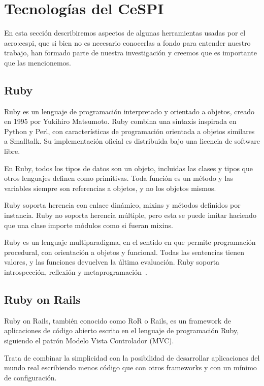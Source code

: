 \section{Tecnologías del CeSPI}
\label{anexo:A}

En esta sección describiremos aspectos de algunas herramientas usadas por el
\gls{acro:cespi}, que si bien no es necesario conocerlas a fondo para entender
nuestro trabajo, han formado parte de nuestra investigación y creemos que es
importante que las mencionemos.

\subsection{Ruby}

Ruby es un lenguaje de programación interpretado y orientado a objetos, creado
en 1995 por Yukihiro Matsumoto. Ruby combina una sintaxis inspirada en Python y
Perl, con características de programación orientada a objetos similares a
Smalltalk. Su implementación oficial es distribuida bajo una licencia de
software libre.

En Ruby, todos los tipos de datos son un objeto, incluidas las clases y tipos
que otros lenguajes definen como primitivas. Toda función es un método y las
variables siempre son referencias a objetos, y no los objetos mismos.

Ruby soporta herencia con enlace dinámico, mixins y métodos definidos por
instancia. Ruby no soporta herencia múltiple, pero esta se puede imitar
haciendo que una clase importe módulos como si fueran mixins.

Ruby es un lenguaje multiparadigma, en el sentido en que permite programación
procedural, con orientación a objetos y funcional. Todas las sentencias tienen
valores, y las funciones devuelven la última evaluación. Ruby soporta
introspección, reflexión y metaprogramación~\cite{ruby}.

\subsection{Ruby on Rails}

Ruby on Rails, también conocido como RoR o Rails, es un framework de
aplicaciones  de código abierto escrito en el lenguaje de programación Ruby,
siguiendo el patrón Modelo Vista Controlador (MVC).

Trata de combinar la simplicidad con la posibilidad de desarrollar aplicaciones
del mundo real escribiendo menos código que con otros frameworks y con un
mínimo de configuración.

